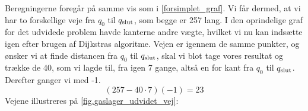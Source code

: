  


Beregningerne foregår på samme vis som i \autoref{forsimplet_graf}. Vi får dermed, at vi har to forskellige veje fra $q_{0}$ til $q_{\textrm{slut}}$, som begge er 257 lang. I den oprindelige graf for det udvidede problem havde kanterne andre vægte, hvilket vi nu kan indsætte igen efter brugen af Dijkstras algoritme. Vejen er igennem de samme punkter, og ønsker vi at finde distancen fra $q_{0}$ til $q_{\textrm{slut}}$, skal vi blot tage vores resultat og trække de 40, som vi lagde til, fra igen 7 gange, altså en for kant fra $q_{0}$ til $q_{\textrm{slut}}$. Derefter ganger vi med -1.
\begin{equation}
(257-40 \cdot 7)(-1) = 23
\end{equation}
Vejene illustreres på \autoref{fig.gaslager_udvidet_vej}:



